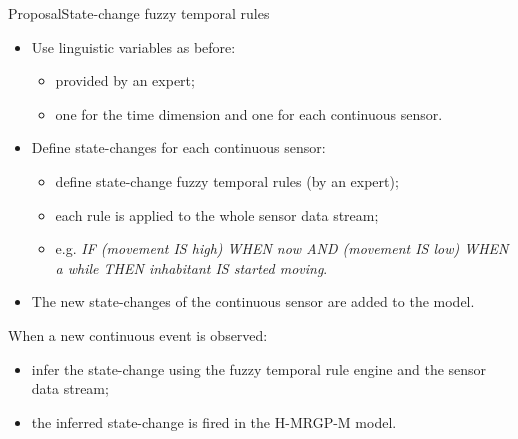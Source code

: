 \documentclass[9pt, handout]{beamer}
\begin{document}
      \begin{frame}{Proposal}{State-change fuzzy temporal rules}
        \pause
        \begin{itemize}
          \item Use linguistic variables as before:
          \begin{itemize}
            \item provided by an expert;
            \item one for the time dimension and one for each continuous sensor.
          \end{itemize}
          \pause
          \item Define state-changes for each continuous sensor:
          \begin{itemize}
            \item define state-change fuzzy temporal rules (by an expert);
            \item each rule is applied to the whole sensor data stream;
            \item e.g. \textit{IF (movement IS high) WHEN now AND (movement IS low) WHEN a while THEN inhabitant IS started moving}.
          \end{itemize}
          \pause
          \item The new state-changes of the continuous sensor are added to the model.
        \end{itemize}
        \pause
        When a new continuous event is observed:
        \pause
        \begin{itemize}
          \item infer the state-change using the fuzzy temporal rule engine and the sensor data stream;
          \item the inferred state-change is fired in the H-MRGP-M model.
        \end{itemize}
      \end{frame}
      
\end{document}
